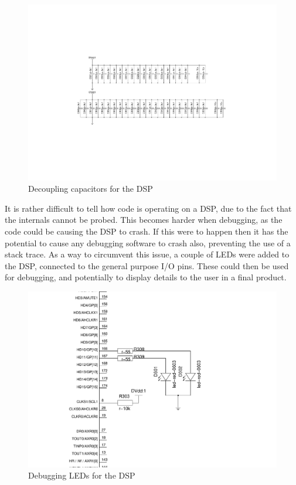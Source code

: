 \begin{figure}[H]
	\centering
	\includegraphics[width=\textwidth]{./img/dsp_decoupling.pdf}
	\caption{Decoupling capacitors for the DSP}
	\label{fig:dspdecouplingcaps}
\end{figure}

\noindent It is rather difficult to tell how code is operating on a DSP, due to the fact that the internals cannot be probed.
This becomes harder when debugging, as the code could be causing the DSP to crash.
If this were to happen then it has the potential to cause any debugging software to crash also, preventing the use of a stack trace.
As a way to circumvent this issue, a couple of LEDs were added to the DSP, connected to the general purpose I/O pins.
These could then be used for debugging, and potentially to display details to the user in a final product.

\begin{figure}[H]
	\centering
	\includegraphics[width=\textwidth]{./img/dsp_LEDs.pdf}
	\caption{Debugging LEDs for the DSP}
	\label{fig:dspdebugleds}
\end{figure}

